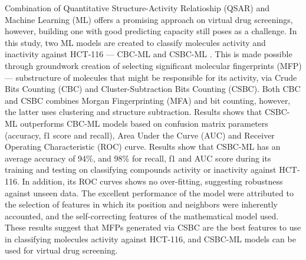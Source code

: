 Combination of Quantitative Structure-Activity Relatioship (QSAR) and Machine Learning (ML) offers a promising approach on virtual drug screenings, however, building one with good predicting capacity still poses as a challenge. In this study, two ML models are created to classify molecules activity and inactivity against HCT-116 --- CBC-ML and CSBC-ML . This is made possible through groundwork creation of selecting significant molecular fingerprints (MFP) --- substructure of molecules that might be responsible for its activity, via Crude Bits Counting (CBC) and Cluster-Subtraction Bits Counting (CSBC). Both CBC and CSBC combines Morgan Fingerprinting (MFA) and bit counting, however, the latter uses clustering and structure subtraction. Results shows that CSBC-ML outperforms CBC-ML models based on confusion matrix parameters (accuracy, f1 score and recall), Area Under the Curve (AUC) and Receiver Operating Characteristic (ROC) curve. Results show that CSBC-ML has an average accuracy of 94\%, and 98\% for recall, f1 and AUC score during its training and testing on classifying compounds activity or inactivity against HCT-116. In addition, its ROC curves shows no over-fitting, suggesting robustness against unseen data. The excellent performance of the model were attributed to the selection of features in which its position and neighbors were inherently accounted, and the self-correcting features of the mathematical model used. These results suggest that MFPs generated via CSBC are the best features to use in classifying molecules activity against HCT-116, and CSBC-ML models can be used for virtual drug screening.    




